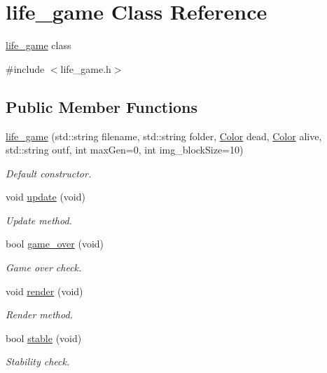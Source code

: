 \hypertarget{classlife__game}{}\section{life\+\_\+game Class Reference}
\label{classlife__game}


\hyperlink{classlife__game}{life\+\_\+game} class  




{\ttfamily \#include $<$life\+\_\+game.\+h$>$}

\subsection*{Public Member Functions}
\begin{DoxyCompactItemize}
\item 
\hyperlink{classlife__game_a9fb79605e28ed5894c2608aba113b503}{life\+\_\+game} (std\+::string filename, std\+::string folder, \hyperlink{structColor}{Color} dead, \hyperlink{structColor}{Color} alive, std\+::string outf, int max\+Gen=0, int img\+\_\+block\+Size=10)
\begin{DoxyCompactList}\small\item\em Default constructor. \end{DoxyCompactList}\item 
void \hyperlink{classlife__game_ad49f74d7d3f981a085ae71b2f85c9447}{update} (void)
\begin{DoxyCompactList}\small\item\em Update method. \end{DoxyCompactList}\item 
bool \hyperlink{classlife__game_a12e6be26d78ff4e230efbe265c59c877}{game\+\_\+over} (void)
\begin{DoxyCompactList}\small\item\em Game over check. \end{DoxyCompactList}\item 
void \hyperlink{classlife__game_a531eaaba274b4e9eee4df10244d631e5}{render} (void)
\begin{DoxyCompactList}\small\item\em Render method. \end{DoxyCompactList}\item 
bool \hyperlink{classlife__game_a51aec1198c8f5b41d910d90dd784f8bf}{stable} (void)
\begin{DoxyCompactList}\small\item\em Stability check. \end{DoxyCompactList}\end{DoxyCompactItemize}


